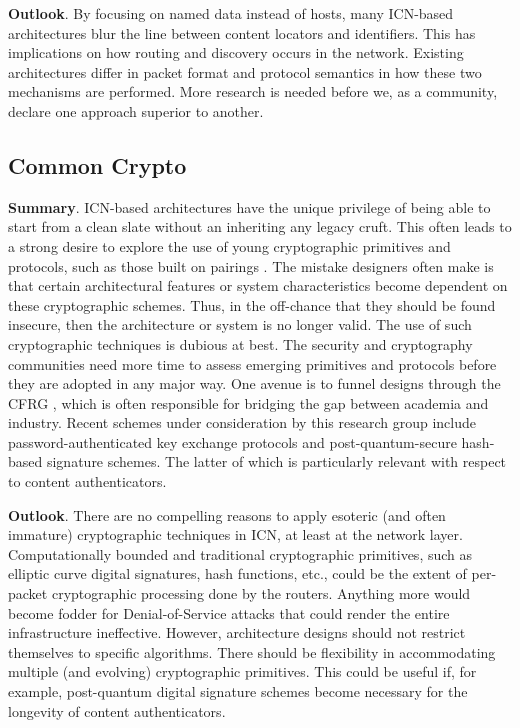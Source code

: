 {\bf Outlook}. By focusing on named data instead of hosts, many ICN-based architectures
blur the line between content locators and identifiers. This has implications on how
routing and discovery occurs in the network. Existing architectures differ in packet format
and protocol semantics in how these two mechanisms are performed. More research is
needed before we, as a community, declare one approach superior to another.

\subsection{Common Crypto}
{\bf Summary}. ICN-based architectures have the unique privilege of being able to start from
a clean slate without an inheriting any legacy cruft. This often leads to a strong
desire to explore the use of young cryptographic primitives and protocols, such as
those built on pairings \cite{wood2014flexible}. The mistake designers often make is
that certain architectural features or system characteristics become dependent on
these cryptographic schemes. Thus, in the off-chance that they should be found insecure,
then the architecture or system is no longer valid. The use of such cryptographic
techniques is dubious at best. The security and cryptography communities need
more time to assess emerging primitives and protocols before they are adopted in
any major way. One avenue is to funnel designs through the CFRG \cite{cfrg}, which
is often responsible for bridging the gap between academia and industry. Recent
schemes under consideration by this research group include password-authenticated key
exchange protocols and post-quantum-secure hash-based signature schemes. The latter
of which is particularly relevant with respect to content authenticators.

{\bf Outlook}. There are no compelling reasons to apply esoteric (and often immature)
cryptographic techniques in ICN, at least at the network layer. Computationally bounded
and traditional cryptographic primitives, such as elliptic curve digital signatures, hash functions, etc.,
could be the extent of per-packet cryptographic processing done by the routers.
Anything more would become fodder for Denial-of-Service attacks that could render
the entire infrastructure ineffective. However, architecture designs should not
restrict themselves to specific algorithms. There should be flexibility in accommodating
multiple (and evolving) cryptographic primitives. This could be useful if, for example,
post-quantum digital signature schemes become necessary for the longevity of content authenticators.

